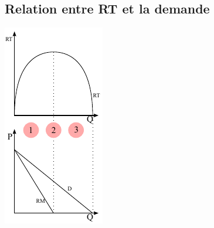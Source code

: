 \subsection{Relation entre RT et la demande}




\begin{minipage}{0.3\textwidth}
    \includegraphics[width=\textwidth]{images/graph_relation_entre_rt_et_demande.pdf}
\end{minipage}

